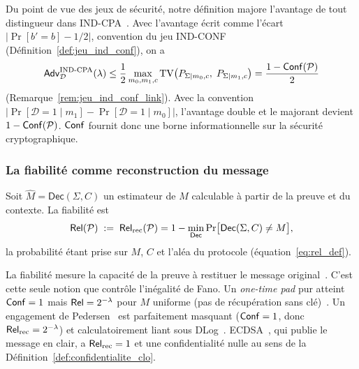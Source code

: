\begin{sloppypar}
Du point de vue des jeux de s\'ecurit\'e, notre d\'efinition majore l'avantage
de tout distingueur dans IND-CPA~\cite{GoldwasserMicali84,Bellare97}. Avec
l'avantage \'ecrit comme l'\'ecart $|\Pr[b'=b] - 1/2|$, convention du jeu IND-CONF
(D\'efinition~\ref{def:jeu_ind_conf}), on a
\begin{equation}
\mathsf{Adv}^{\text{IND-CPA}}_{\mathcal{D}}(\lambda)
  \leq \frac{1}{2}\max_{m_0,m_1,c} \operatorname{TV}\!\left(P_{\Sigma|m_0,c},\; P_{\Sigma|m_1,c}\right)
  = \frac{1 - \mathsf{Conf}(\mathcal{P})}{2}
\label{eq:adv_ind_cpa}
\end{equation}
(Remarque~\ref{rem:jeu_ind_conf_link}). Avec la convention
$|\Pr[\mathcal{D}=1 \mid m_1] - \Pr[\mathcal{D}=1 \mid m_0]|$, l'avantage double et
le majorant devient $1 - \mathsf{Conf}(\mathcal{P})$.
$\mathsf{Conf}$ fournit donc une borne informationnelle sur la s\'ecurit\'e cryptographique.

\subsubsection{La fiabilit\'e comme reconstruction du message}
\label{subsubsec:fiabilite_clo}

\begin{definition}\label{def:fiabilite_clo}
Soit $\hat{M} = \mathsf{Dec}(\Sigma, C)$ un estimateur de $M$ calculable \`a
partir de la preuve et du contexte. La fiabilit\'e est
\begin{equation}
\mathsf{Rel}(\mathcal{P}) \;:=\; \mathsf{Rel}_{\mathrm{rec}}(\mathcal{P})
  = 1 - \min_{\mathsf{Dec}} \Pr\bigl[\mathsf{Dec}(\Sigma, C) \neq M\bigr],
\label{eq:rel_clo}
\end{equation}
la probabilit\'e \'etant prise sur $M$, $C$ et l'al\'ea du protocole
(\'equation~\eqref{eq:rel_def}).
\end{definition}

La fiabilit\'e mesure la capacit\'e de la preuve \`a restituer le message
original~\cite{Fano61,CoverThomas06}. C'est cette seule notion que
contr\^ole l'in\'egalit\'e de Fano. Un \emph{one-time pad} pur atteint
$\mathsf{Conf} = 1$ mais $\mathsf{Rel} = 2^{-\lambda}$ pour $M$ uniforme (pas de
r\'ecup\'eration sans cl\'e)~\cite{Shannon49}. Un engagement de
Pedersen~\cite{Pedersen91,ChaumPedersen92} est parfaitement masquant
($\mathsf{Conf} = 1$, donc $\mathsf{Rel}_{\mathrm{rec}} = 2^{-\lambda}$) et calculatoirement liant sous
DLog~\cite{Damgard87}. ECDSA~\cite{Johnson01,NIST.FIPS.186-5}, qui publie le message
en clair, a $\mathsf{Rel}_{\mathrm{rec}} = 1$ et une confidentialit\'e nulle au sens de la
D\'efinition~\ref{def:confidentialite_clo}.


\end{sloppypar}
